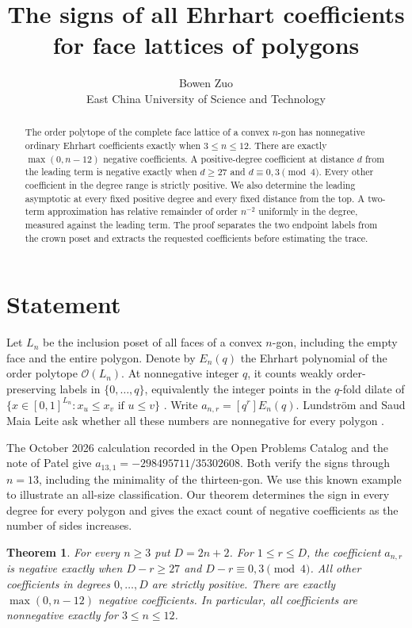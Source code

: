 \documentclass[11pt]{article}
\title{The signs of all Ehrhart coefficients for face lattices of polygons}
\author{Bowen Zuo\\{\normalsize East China University of Science and Technology}}
\date{}
\newtheorem{theorem}{Theorem}
\newcommand{\OO}{\mathcal O}
\begin{document}
\maketitle
\begin{abstract}
The order polytope of the complete face lattice of a convex \(n\)-gon
has nonnegative ordinary Ehrhart coefficients exactly when \(3\le n\le12\).
There are exactly \(\max(0,n-12)\) negative coefficients. A positive-degree
coefficient at distance \(d\) from the leading term is negative exactly
when \(d\ge27\) and \(d\equiv0,3\pmod4\). Every other coefficient in the
degree range is strictly positive. We also determine the leading asymptotic
at every fixed positive degree and every fixed distance from the top.
A two-term approximation has relative remainder of order \(n^{-2}\) uniformly in the degree, measured against the leading term.
The proof separates the two endpoint labels from the crown
poset and extracts the requested coefficients before estimating the trace.
\end{abstract}

\section{Statement}

Let \(L_n\) be the inclusion poset of all faces of a convex \(n\)-gon,
including the empty face and the entire polygon. Denote by \(E_n(q)\)
the Ehrhart polynomial of the order polytope \(\OO(L_n)\). At
nonnegative integer \(q\), it counts weakly order-preserving labels in
\(\{0,\ldots,q\}\), equivalently the integer points in the \(q\)-fold
dilate of \(\{x\in[0,1]^{L_n}:x_u\le x_v\text{ if }u\le v\}\)
\cite{stanley}. Write \(a_{n,r}=[q^r]E_n(q)\). Lundstr\"om and Saud Maia
Leite ask whether all these numbers are nonnegative for every polygon
\cite[Question 6.4; preprint Question 6.5]{crown}.

The October 2026 calculation recorded in the Open Problems Catalog
\cite{catalog} and the note of Patel \cite{patel} give
\(a_{13,1}=-298495711/35302608\). Both verify the signs through
\(n=13\), including the minimality of the thirteen-gon. We use this
known example to illustrate an all-size classification. Our theorem
determines the sign in every degree for every polygon and gives the
exact count of negative coefficients as the number of sides increases.

\begin{theorem}\label{classification}
For every \(n\ge3\) put \(D=2n+2\). For \(1\le r\le D\), the coefficient
\(a_{n,r}\) is negative exactly when \(D-r\ge27\) and
\(D-r\equiv0,3\pmod4\). All other coefficients in degrees \(0,\ldots,D\)
are strictly positive. There are exactly \(\max(0,n-12)\) negative
coefficients. In particular, all coefficients are nonnegative exactly for
\(3\le n\le12\).
\end{theorem}
\end{document}
